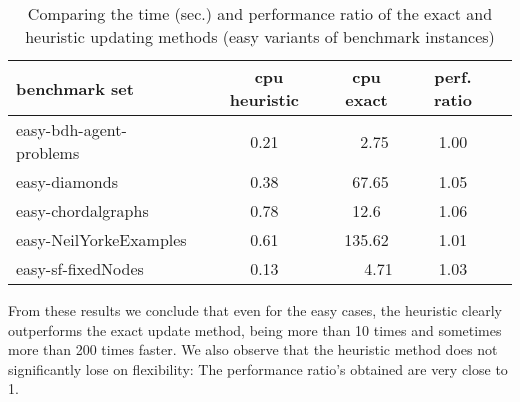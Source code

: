 \begin{table}[h]
\begin{center}
\caption{Comparing the time (sec.) and performance ratio of the exact and heuristic updating methods (easy variants of benchmark instances) }\label{table3}
\begin{tabular}{ |  l || c c c c  | }
  \hline
  {\bf benchmark set}          & \ {\bf cpu heuristic} & {\bf cpu exact}  & {\bf  perf. ratio} &\\
  \hline			
  easy-bdh-agent-problems\ \ \   & 0.21  & \ \ 2.75  & 1.00 &  \\
  easy-diamonds                         & 0.38  & \ 67.65 & 1.05 & \\
  easy-chordalgraphs           & 0.78  & 12.6 & 1.06 &  \\
  easy-NeilYorkeExamples  & 0.61 &  135.62 &  1.01&  \\
  easy-sf-fixedNodes           & 0.13 & \ \ \ 4.71 & 1.03&  \\
  \hline  
\end{tabular}
\end{center}
\end{table}
From these results we conclude that even for the easy cases, the heuristic clearly outperforms the exact update method, being more than 10 times and sometimes more than 200 times faster.  We also observe that the heuristic method does not significantly lose on flexibility: The performance ratio's obtained are very close to 1. 

